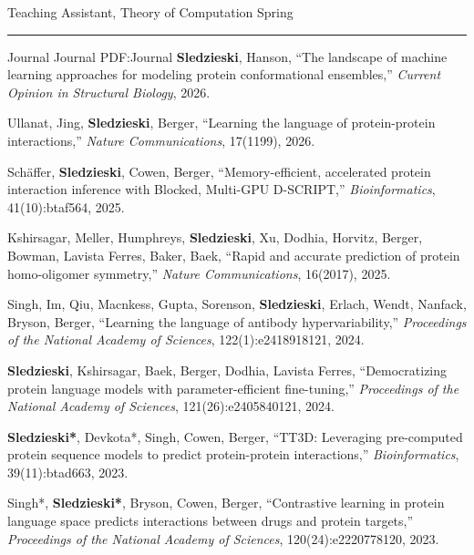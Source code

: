 \documentclass[letterpaper,MMMyyyy,nonstopmode]{simpleresumecv}
\begin{document}
\begin{Body}
\Gap
\Item Teaching Assistant, Theory of Computation
\hfill
Spring 


\BigGap
\hrule
\Section
{Journal}
{Journal}
{PDF:Journal}
\Gap
\NumberedItem{[12]}
{{\textbf{Sledzieski}, Hanson}, 
``The landscape of machine learning approaches for modeling protein conformational ensembles,'' 
\textit{Current Opinion in Structural Biology}, 2026.
}

\Gap
\NumberedItem{[11]}
{{Ullanat, Jing, \textbf{Sledzieski}, Berger}, 
``Learning the language of protein-protein interactions,'' 
\textit{Nature Communications}, 17(1199), 2026.
}

\Gap
\NumberedItem{[10]}
{{Schäffer, \textbf{Sledzieski}, Cowen, Berger}, 
``Memory-efficient, accelerated protein interaction inference with Blocked, Multi-GPU D-SCRIPT,'' 
\textit{Bioinformatics}, 41(10):btaf564, 2025.
}

\Gap
\NumberedItem{[9]}
{{Kshirsagar, Meller, Humphreys, \textbf{Sledzieski}, Xu, Dodhia, Horvitz, Berger, Bowman, Lavista Ferres, Baker, Baek}, 
``Rapid and accurate prediction of protein homo-oligomer symmetry,'' 
\textit{Nature Communications}, 16(2017), 2025.
}

\Gap
\NumberedItem{[8]}
{{Singh, Im, Qiu, Macnkess, Gupta, Sorenson, \textbf{Sledzieski}, Erlach, Wendt, Nanfack, Bryson, Berger}, 
``Learning the language of antibody hypervariability,'' 
\textit{Proceedings of the National Academy of Sciences}, 122(1):e2418918121, 2024.
}

\Gap
\NumberedItem{[7]}
{{\textbf{Sledzieski}, Kshirsagar, Baek, Berger, Dodhia, Lavista Ferres}, 
``Democratizing protein language models with parameter-efficient fine-tuning,'' 
\textit{Proceedings of the National Academy of Sciences}, 121(26):e2405840121, 2024.
}

\Gap
\NumberedItem{[6]}
{{\textbf{Sledzieski*}, Devkota*, Singh, Cowen, Berger}, 
``TT3D: Leveraging pre-computed protein sequence models to predict protein-protein interactions,'' 
\textit{Bioinformatics}, 39(11):btad663, 2023.
}

\Gap
\NumberedItem{[5]}
{{Singh*, \textbf{Sledzieski*}, Bryson, Cowen, Berger}, 
``Contrastive learning in protein language space predicts interactions between drugs and protein targets,'' 
\textit{Proceedings of the National Academy of Sciences}, 120(24):e2220778120, 2023.
}


\end{Body}
\end{document}
